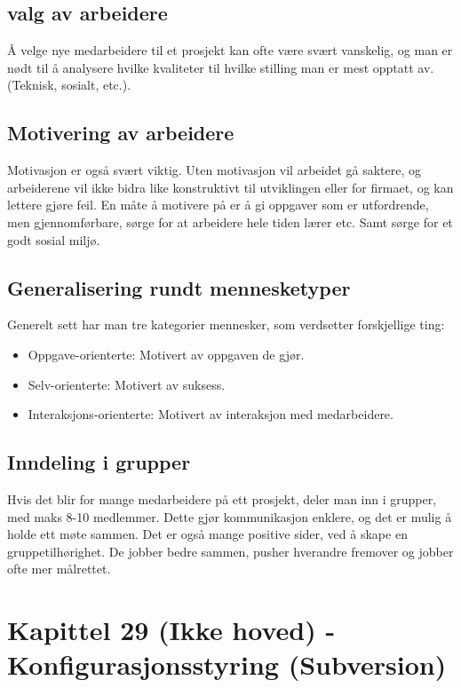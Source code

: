 \documentclass[11pt]{article}
\begin{document}
\subsection{valg av arbeidere}
\label{sec-15.1}

  Å velge nye medarbeidere til et prosjekt kan ofte være svært vanskelig, 
  og man er nødt til å analysere hvilke kvaliteter til hvilke stilling man 
  er mest opptatt av. (Teknisk, sosialt, etc.).
\subsection{Motivering av arbeidere}
\label{sec-15.2}

   Motivasjon er også svært viktig. Uten motivasjon vil arbeidet gå saktere, 
   og arbeiderene vil ikke bidra like konstruktivt til utviklingen eller for 
   firmaet, og kan lettere gjøre feil. En måte å motivere på er å gi oppgaver 
   som er utfordrende, men gjennomførbare, sørge for at arbeidere hele tiden 
   lærer etc. Samt sørge for et godt sosial miljø.
\subsection{Generalisering rundt mennesketyper}
\label{sec-15.3}

   Generelt sett har man tre kategorier mennesker, som verdsetter forskjellige ting:

\begin{itemize}
\item Oppgave-orienterte: 
     Motivert av oppgaven de gjør.
\item Selv-orienterte: 
     Motivert av suksess.
\item Interaksjons-orienterte: 
     Motivert av interaksjon med medarbeidere.
\end{itemize}
\subsection{Inndeling i grupper}
\label{sec-15.4}

   Hvis det blir for mange medarbeidere på ett prosjekt, deler man inn i grupper, 
   med maks 8-10 medlemmer. Dette gjør kommunikasjon enklere, og det er mulig å 
   holde ett møte sammen. Det er også mange positive sider, ved å skape en gruppetilhørighet. 
   De jobber bedre sammen, pusher hverandre fremover og jobber ofte mer målrettet.
\section{Kapittel 29 (Ikke hoved) - Konfigurasjonsstyring (Subversion)}
\label{sec-16}
\end{document}
